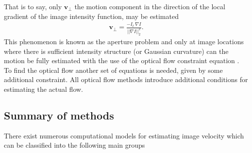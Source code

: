 \documentclass[letterpaper,11pt]{article}
\begin{document}
That is to say, only $\mathbf{v_{\perp}}$ the motion component in the direction of the local gradient of the image intensity
function, may be estimated
\begin{align}
\mathbf{v_{\perp}} = \frac{- I_t ~\nabla I}{|| \nabla I ||_2^2}.
\label{eq:normal-v}
\end{align}
This phenomenon is known as the aperture problem and only at image
locations where there is sufficient intensity structure (or Gaussian curvature) can the motion be fully estimated with the use of the optical flow constraint equation \citep{Beauchemin:1995}. To find the optical flow another set of equations is needed, given by some additional constraint. All optical flow methods introduce additional conditions for estimating the actual flow.

\subsection{Summary of methods}
\label{sub:summary}
There exist numerous computational models for estimating image velocity which can be classified into the following main groups
\end{document}

